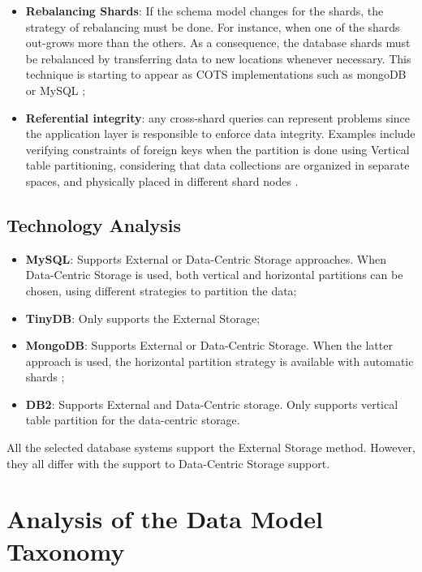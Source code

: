 \begin{itemize}
  \item \textbf{Rebalancing Shards}: If the schema model changes for the
  shards, the strategy of rebalancing must be done. For instance, when one of
  the shards out-grows more than the others. As a consequence, the database
  shards must be rebalanced by transferring data to new locations whenever
  necessary. This technique is starting to appear as COTS implementations such
  as mongoDB \cite{mongodb} or MySQL \cite{mysql};
  \item \textbf{Referential integrity}: any cross-shard queries can represent
  problems since the application layer is responsible to enforce data
  integrity. Examples include verifying constraints of foreign keys when the
  partition is done using Vertical table partitioning, considering that data
  collections are organized in separate spaces, and physically placed in
  different shard nodes \cite{db-table-partition}.
\end{itemize}

\subsection{Technology Analysis}

\begin{itemize}
  \item \textbf{MySQL}: Supports External or Data-Centric Storage approaches.
  When Data-Centric Storage is used, both vertical and horizontal partitions
  \cite{db-partitioning-relational} can be chosen, using different strategies
  to partition the data;
  \item \textbf{TinyDB}: Only supports the External Storage;
  \item \textbf{MongoDB}: Supports External or Data-Centric Storage. When the
  latter approach is used, the horizontal partition strategy is available with
  automatic shards \cite{db-mongo-partition};
  \item \textbf{DB2}: Supports External and Data-Centric storage. Only supports
  vertical table partition \cite{db-db2-partition} for the data-centric storage.
\end{itemize}

All the selected database systems support the External Storage method. However,
they all differ with the support to Data-Centric Storage support.

\section{Analysis of the Data Model Taxonomy}

